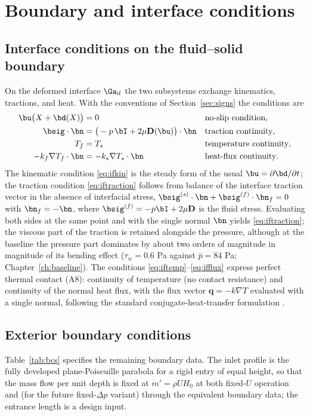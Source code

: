 \chapter{Boundary and interface conditions}
\label{ch:interface}

\section{Interface conditions on the fluid--solid boundary}
\label{sec:interface}
On the deformed interface $\Ga_{\mathrm{if}}$ the two subsystems exchange kinematics, tractions,
and heat. With the conventions of Section~\ref{sec:signs} the conditions are
\begin{align}
\bu\big(X+\bd(X)\big)&=0 &&\text{no-slip condition}, \label{eq:ifkin}\\
\bsig\cdot\bn &= \big(-p\,\bI+2\mu\mathbf D(\bu)\big)\cdot\bn &&\text{traction continuity}, \label{eq:iftraction}\\
T_f &= T_s &&\text{temperature continuity}, \label{eq:iftemp}\\
-k_f\nabla T_f\cdot\bn &= -k_s\nabla T_s\cdot\bn &&\text{heat-flux continuity}. \label{eq:ifflux}
\end{align}
The kinematic condition \eqref{eq:ifkin} is the steady form of the usual
$\bu=\partial\bd/\partial t$; the traction condition
\eqref{eq:iftraction} follows from balance of the interface traction vector in the absence of
interfacial stress, $\bsig^{(s)}\cdot\bn+\bsig^{(f)}\cdot\bn_f=0$ with $\bn_f=-\bn$, where
$\bsig^{(f)}=-p\bI+2\mu\mathbf D$ is the fluid stress. Evaluating both sides at the same point and
with the single normal $\bn$ yields \eqref{eq:iftraction}; the viscous part of the traction is
retained alongside the pressure, although at the baseline the pressure part dominates by about two
orders of magnitude in magnitude of its bending effect ($\tau_w=0.6$ Pa against
$\bar p=84$ Pa; Chapter~\ref{ch:baseline}). The conditions \eqref{eq:iftemp}--\eqref{eq:ifflux}
express perfect thermal contact (A8): continuity of temperature (no contact resistance) and
continuity of the normal heat flux, with the flux vector $\mathbf q=-k\nabla T$ evaluated with a
single normal, following the standard conjugate-heat-transfer formulation
\cite{carslaw1947conduction}.

\section{Exterior boundary conditions}
\label{sec:bcs}
Table~\ref{tab:bcs} specifies the remaining boundary data. The inlet profile is the fully developed
plane-Poiseuille parabola for a rigid entry of equal height, so that the mass flow per unit depth
is fixed at $\dot m'=\rho UH_0$ at both fixed-$U$ operation and (for the future fixed-$\Delta p$
variant) through the equivalent boundary data; the entrance length is a design input.

